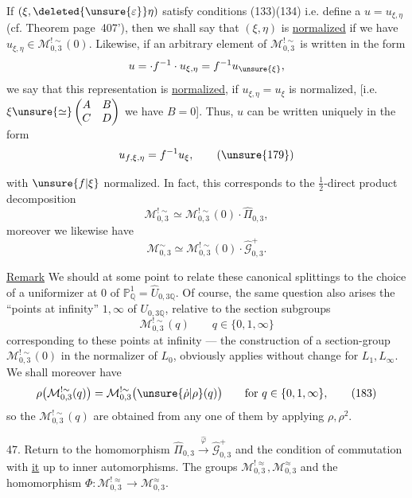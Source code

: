 If $(\xi,\deleted{\unsure{\varepsilon}}\eta)$ satisfy conditions (133)(134) i.e. define a $u=u_{\xi,\eta}$ (cf. Theorem page~407'), then we shall say that $(\xi,\eta)$ is \uline{normalized} if we have $u_{\xi,\eta}\in\mathcal M_{0,3}^{!\sim}(0)$. Likewise, if an arbitrary element of $\mathcal M_{0,3}^{!\sim}$ is written in the form
\[
u=\cdot f^{-1}\cdot u_{\xi,\eta}=f^{-1}u_{\unsure{\xi}},
\]
we say that this representation  is \uline{normalized}, if $u_{\xi,\eta}=u_\xi$ is normalized, [i.e.   $\xi\unsure{\simeq}\begin{pmatrix}A&B\\C&D\end{pmatrix}$  we have $B=0$]. Thus,  $u$ can be written uniquely in the form
\[
u_{f,\xi,\eta}=f^{-1}u_\xi,
\tag{\unsure{179}}
\]

with $\unsure{f|\xi}$ normalized. In fact, this corresponds to the $\frac12$-direct product decomposition
\[
\mathcal M_{0,3}^{!\sim}\simeq\mathcal M_{0,3}^{!\sim}(0)\cdot\widehat\Pi_{0,3},
\tag{180}
\]
moreover we likewise have
\[
\mathcal M_{0,3}^{\sim}\simeq\mathcal M_{0,3}^{!\sim}(0)\cdot\widehat{\mathcal G}_{0,3}^{+}.
\tag{181}
\]

\uline{Remark} We should at some point  to relate these canonical splittings to the choice of a uniformizer at $0$ of $\mathbb P^1_{\mathbb Q}=\widehat U_{0,3\mathbb Q}$. Of course, the same question also arises  the  ``points at infinity'' $1,\infty$ of $U_{0,3\mathbb Q}$, relative to the section subgroups
\[
\mathcal M_{0,3}^{!\sim}(q)\qquad q\in\{0,1,\infty\}
\tag{182}
\]
corresponding to these points at infinity --- the construction of a section-group $\mathcal M_{0,3}^{!\sim}(0)$ in the normalizer of $L_0$, obviously applies without change for $L_1,L_\infty$. We shall moreover have
\[
\rho\bigl(\mathcal M_{0,3}^{!\sim}(q)\bigr)=\mathcal M_{0,3}^{!\sim}\bigl(\unsure{\dot\rho|\rho}(q)\bigr)\qquad\text{for }q\in\{0,1,\infty\},
\tag{183}
\]
so the  $\mathcal M_{0,3}^{!\sim}(q)$ are obtained from any one of them by applying $\rho,\rho^2$.

47. Return to the homomorphism $\widehat\Pi_{0,3}\xrightarrow{\widehat\varphi}\widehat{\mathcal G}_{0,3}^{+}$ and the condition of commutation with \uline{it} up to inner automorphisms. The groups $\mathcal M_{0,3}^{!\approx},\mathcal M_{0,3}^{\approx}$ and the homomorphism $\Phi:\mathcal M_{0,3}^{!\approx}\longrightarrow\mathcal M_{0,3}^{\approx}$.

